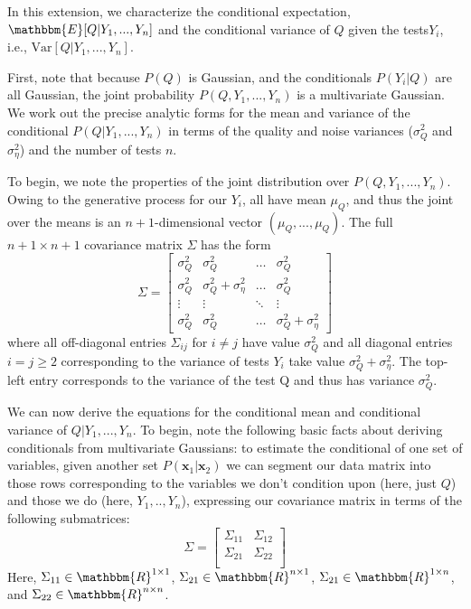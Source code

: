 In this extension, we characterize the conditional expectation, $\mathbbm{E}[Q|Y_1,...,Y_n]$ and
 the conditional variance of $Q$ given the tests$Y_i$, i.e., $\text{Var}[Q|Y_1,...,Y_n]$.
 
First, note that because $P(Q)$ is Gaussian, 
and the conditionals $P(Y_i|Q)$ are all Gaussian,
the joint probability $P(Q, Y_1, ..., Y_n)$
is a multivariate Gaussian.
We work out the precise analytic forms
for the mean and variance of the conditional 
$P(Q | Y_1, ..., Y_n)$ in terms of the quality and noise variances 
($\sigma_Q^2$ and $\sigma_\eta^2$) and the number of tests $n$. 

To begin, we note the properties of the joint distribution over $P(Q, Y_1, ..., Y_n)$.
Owing to the generative process for our $Y_i$,
all have mean $\mu_Q$, 
and thus the joint over the means is an $n+1$-dimensional vector
$(\mu_Q, ..., \mu_Q)$.
The full $n+1 \times n+1$ covariance matrix $\Sigma$ has the form
\begin{equation}
\label{eq:covariance}
\Sigma =
\begin{bmatrix}
    \sigma_Q^2 & \sigma_Q^2 &  \dots  & \sigma_Q^2 \\
    \sigma_Q^2 & \sigma_Q^2 + \sigma_\eta^2 & \dots  & \sigma_Q^2 \\
    \vdots & \vdots & \ddots & \vdots \\
    \sigma_Q^2 & \sigma_Q^2 &  \dots  & \sigma_Q^2 + \sigma_\eta^2 
\end{bmatrix}
\end{equation}
where all off-diagonal entries $\Sigma_{ij}$ for $i\neq j$ have value $\sigma_Q^2$ and all diagonal entries $i=j \geq 2$ corresponding to the variance of tests $Y_i$ take value $\sigma_Q^2 + \sigma_\eta^2$. The top-left entry corresponds to the variance of the test Q and thus has variance $\sigma_Q^2$.

We can now derive the equations for the conditional mean and conditional variance of $Q|Y_1,...,Y_n$.
To begin, note the following basic facts about deriving conditionals from multivariate Gaussians:
to estimate the conditional of one set of variables, 
given another set $P(\mathbf{x}_1|\mathbf{x}_2)$ 
we can segment our data matrix into those rows corresponding 
to the variables we don't condition upon (here, just $Q$) 
and those we do (here, $Y_1,..,Y_n$), 
expressing our covariance matrix in terms of the following submatrices:
\[
\Sigma =
\begin{bmatrix}
    \Sigma_{11} & \Sigma_{12} \\
    \Sigma_{21} & \Sigma_{22} \\
\end{bmatrix}
\]
Here, $\Sigma_{11}\in \mathbbm{R}^{1\times 1}$,
$\Sigma_{21}\in \mathbbm{R}^{n \times 1}$,
$\Sigma_{21}\in \mathbbm{R}^{1 \times n}$, and
$\Sigma_{22}\in \mathbbm{R}^{n \times n}$.

